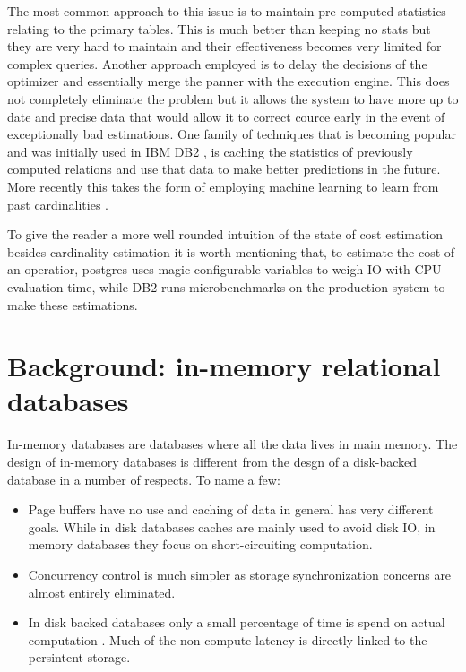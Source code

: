 The most common approach to this issue is to maintain pre-computed
statistics relating to the primary tables. This is much better than
keeping no stats but they are very hard to maintain and their
effectiveness becomes very limited for complex queries. Another
approach employed is to delay the decisions of the optimizer and
essentially merge the panner with the execution engine. This does not
completely eliminate the problem but it allows the system to have more
up to date and precise data that would allow it to correct cource
early in the event of exceptionally bad estimations. One family of
techniques that is becoming popular and was initially used in IBM DB2
\cite{stillgerLEODB2LearningOptimizer2001}, is caching the statistics
of previously computed relations and use that data to make better
predictions in the future. More recently this takes the form of
employing machine learning to learn from past cardinalities
\cite{ortizEmpiricalAnalysisDeep2019}.

To give the reader a more well rounded intuition of the state of cost
estimation besides cardinality estimation it is worth mentioning that,
to estimate the cost of an operatior, postgres uses magic configurable
variables to weigh IO with CPU evaluation time, while DB2 runs
microbenchmarks on the production system to make these estimations.


\section{Background: in-memory relational databases}
\label{sec:org96af629}
In-memory databases are databases where all the data lives in main
memory. The design of in-memory databases is different from the desgn
of a disk-backed database in a number of respects. To name a few:

\begin{itemize}
\item Page buffers have no use and caching of data in general has very
different goals. While in disk databases caches are mainly used to
avoid disk IO, in memory databases they focus on short-circuiting
computation.
\item Concurrency control is much simpler as storage synchronization
concerns are almost entirely eliminated.
\item In disk backed databases only a small percentage of time is spend on
actual computation \cite{harizopoulosOLTPLookingGlass2018}. Much of
the non-compute latency is directly linked to the persintent
storage.
\end{itemize}

